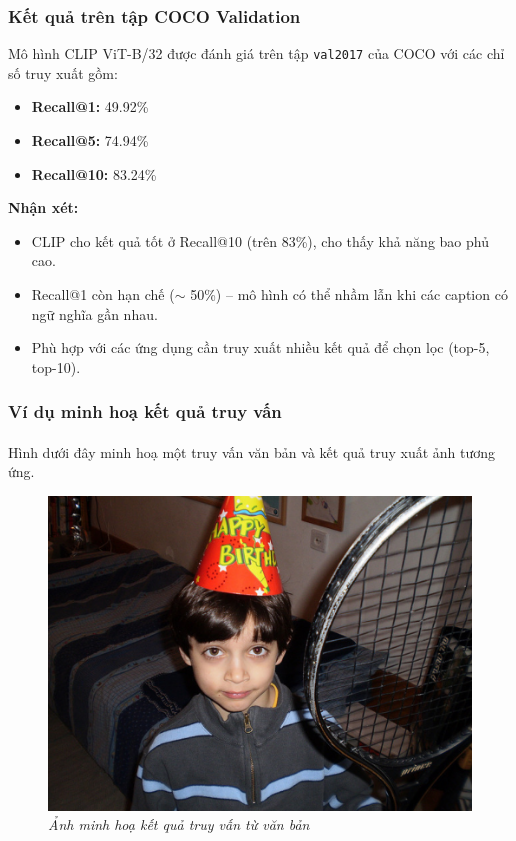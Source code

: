 {\subsubsection{Kết quả trên tập COCO Validation}

Mô hình CLIP ViT-B/32 được đánh giá trên tập \texttt{val2017} của COCO với các chỉ số truy xuất gồm:

\begin{itemize}
    \item \textbf{Recall@1:} 49.92\%
    \item \textbf{Recall@5:} 74.94\%
    \item \textbf{Recall@10:} 83.24\%
\end{itemize}

\textbf{Nhận xét:}
\begin{itemize}
    \item CLIP cho kết quả tốt ở Recall@10 (trên 83\%), cho thấy khả năng bao phủ cao.
    \item Recall@1 còn hạn chế ($\sim$ 50\%) – mô hình có thể nhầm lẫn khi các caption có ngữ nghĩa gần nhau.
    \item Phù hợp với các ứng dụng cần truy xuất nhiều kết quả để chọn lọc (top-5, top-10).
\end{itemize}

\subsubsection{Ví dụ minh hoạ kết quả truy vấn}

\paragraph{}{Hình dưới đây minh hoạ một truy vấn văn bản và kết quả truy xuất ảnh tương ứng.}

\begin{figure}[H]
    \centering
    \includegraphics[width=0.6\linewidth]{img/05-imagecaption.png} %
    \caption{\textit{Ảnh minh hoạ kết quả truy vấn từ văn bản}}
\end{figure}

}
